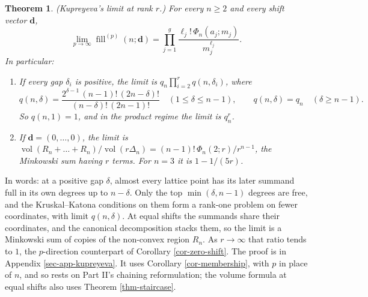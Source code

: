 \documentclass[11pt, a4paper, abstract=yes]{scrartcl}
\theoremstyle{definition}
\theoremstyle{remark}
\theoremstyle{plain}
\newtheorem{theorem}[definition]{Theorem}
\newcommand{\vek}[1]{\boldsymbol{#1}}
\theoremstyle{remark}
\theoremstyle{plain}
\newcommand{\vol}{\operatorname{vol}}
\newcommand{\leannone}{\tikz[baseline=-0.6ex]\draw[leannone,line width=0.6pt] (0,0) circle (0.55ex);}
\newcommand{\leanmark}[1]{\leavevmode{\reversemarginpar\marginnote{\raggedleft#1}}}
\begin{document}
\begin{theorem}
\leanmark{\leannone}(\emph{Kupreyeva's limit at rank \(r\).}) For every \(n\ge2\) and every shift vector \(\vek d\),
\[
  \lim_{p\to\infty}\operatorname{fill}^{(p)}(n;\vek d)
  =\prod_{j=1}^g\frac{\ell_j!\,\Phi_n(a_j;m_j)}{m_j^{\ell_j}} .
\]
In particular:
\begin{enumerate}
\item If every gap \(\delta_i\) is positive, the limit is \(q_n\prod_{i=2}^rq(n,\delta_i)\), where
\begin{equation}\label{eq:qndelta}
  q(n,\delta)=\frac{2^{\delta-1}\,(n-1)!\,(2n-\delta)!}{(n-\delta)!\,(2n-1)!}
  \quad(1\le\delta\le n-1),\qquad q(n,\delta)=q_n\quad(\delta\ge n-1).
\end{equation}
So \(q(n,1)=1\), and in the product regime the limit is \(q_n^r\).
\item If \(\vek d=(0,\dots,0)\), the limit is
\(\vol(R_n+\dots+R_n)/\vol(r\Delta_n)=(n-1)!\,\Phi_n(2;r)/r^{n-1}\), the Minkowski sum having
\(r\) terms. For \(n=3\) it is \(1-1/(5r)\).
\end{enumerate}
\label{thm-kupreyeva-rank-r}
\end{theorem}

In words: at a positive gap \(\delta\), almost every lattice point has its later summand full in
its own degrees up to \(n-\delta\). Only the top \(\min(\delta,n-1)\) degrees are free, and the
Kruskal--Katona conditions on them form a rank-one problem on fewer coordinates, with limit
\(q(n,\delta)\). At equal shifts the summands share their coordinates, and the canonical
decomposition stacks them, so the limit is a Minkowski sum of copies of the non-convex region
\(R_n\). As \(r\to\infty\) that ratio tends to \(1\), the \(p\)-direction counterpart of
Corollary \ref{cor-zero-shift}. The proof is in Appendix \ref{sec-app-kupreyeva}. It uses
Corollary \ref{cor-membership}, with \(p\) in place of \(n\), and so rests on Part II's chaining
reformulation; the volume formula at equal shifts also uses Theorem \ref{thm-staircase}.
\end{document}
